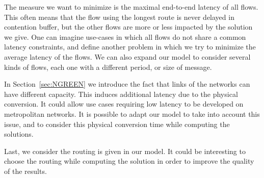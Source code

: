 The measure we want to minimize is the maximal end-to-end latency of all flows. This often means that the flow using the longest route is never delayed in contention buffer, but the other flows are more or less impacted by the solution we give. One can imagine use-cases in which all flows do not share a common latency constraints, and define another problem in which we try to minimize the average latency of the flows. 
 We can also expand our model to consider several kinds of flows, each one with a different period, or size of message.

In Section~\ref{sec:NGREEN} we introduce the fact that links of the networks can have different capacity. This induces additional latency due to the physical conversion. It could allow use cases requiring low latency to be developed on metropolitan networks. It is possible to adapt our model to take into account this issue, and to consider this physical conversion time while computing the solutions. 

Last, we consider the routing is given in our model. It could be interesting to choose the routing while computing the solution in order to improve the quality of the results.
